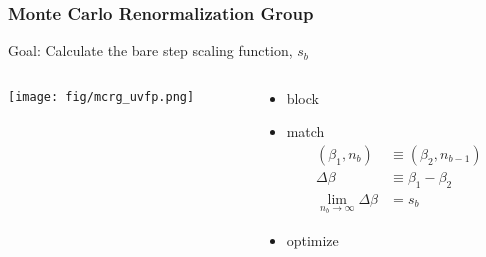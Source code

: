   \begin{frame}
    \frametitle{Monte Carlo Renormalization Group}
    Goal:  Calculate the bare step scaling function, $s_b$
    \vspace{24pt}
    \begin{columns}[T]
      \begin{column}{.5\textwidth}
        \begin{block}{}
          \texttt{[image: fig/mcrg\_uvfp.png]}
        \end{block}
      \end{column}
      \begin{column}{.5\textwidth}
        \begin{itemize}
          \item block
          \item match
          \begin{equation*}
            \begin{aligned}
              (\beta_1,n_b) &\equiv(\beta_2,n_{b-1})\\
              \Delta\beta &\equiv \beta_1-\beta_2\\
              \lim_{n_b\to\infty} \Delta\beta &= s_b
            \end{aligned}
          \end{equation*}
          \item optimize
        \end{itemize}
      \end{column}
    \end{columns}
  \end{frame}

